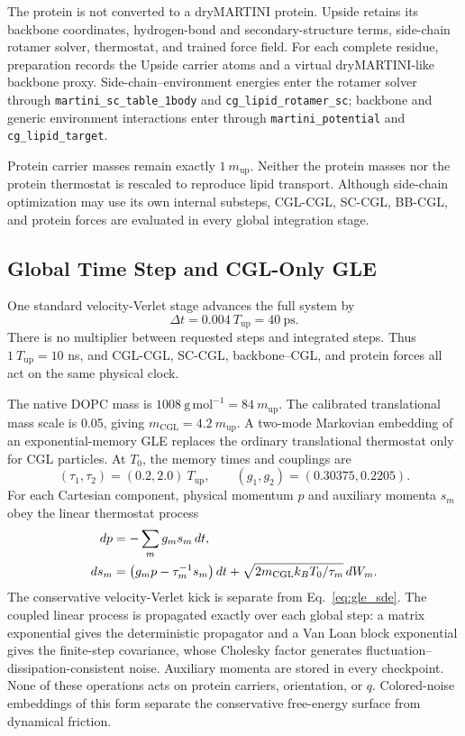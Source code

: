 \documentclass{article}
\begin{document}
The protein is not converted to a dryMARTINI protein.  Upside retains its
backbone coordinates, hydrogen-bond and secondary-structure terms, side-chain
rotamer solver, thermostat, and trained force field.  For each complete
residue, preparation records the Upside carrier atoms and a virtual
dryMARTINI-like backbone proxy.  Side-chain--environment energies enter the
rotamer solver through \texttt{martini\_sc\_table\_1body} and
\texttt{cg\_lipid\_rotamer\_sc}; backbone and generic environment interactions
enter through \texttt{martini\_potential} and \texttt{cg\_lipid\_target}.

Protein carrier masses remain exactly $1~m_{\mathrm{up}}$.  Neither the
protein masses nor the protein thermostat is rescaled to reproduce lipid
transport.  Although side-chain optimization may use its own internal
substeps, CGL-CGL, SC-CGL, BB-CGL, and protein forces are evaluated in every
global integration stage.

\subsection{Global Time Step and CGL-Only GLE}

One standard velocity-Verlet stage advances the full system by
\begin{equation}
\Delta t=0.004~T_{\mathrm{up}}=40~\mathrm{ps}.
\label{eq:timestep}
\end{equation}
There is no multiplier between requested steps and integrated steps.  Thus
$1~T_{\mathrm{up}}=10$ ns, and CGL-CGL, SC-CGL, backbone--CGL, and protein
forces all act on the same physical clock.

The native DOPC mass is $1008~\mathrm{g\,mol^{-1}}=84~m_{\mathrm{up}}$.  The
calibrated translational mass scale is 0.05, giving
$m_{\mathrm{CGL}}=4.2~m_{\mathrm{up}}$.  A two-mode Markovian embedding of an
exponential-memory GLE replaces the ordinary translational thermostat only for
CGL particles.  At $T_0$, the memory times and couplings are
\begin{equation}
(\tau_1,\tau_2)=(0.2,2.0)~T_{\mathrm{up}},\qquad
(g_1,g_2)=(0.30375,0.2205).
\label{eq:gle}
\end{equation}
For each Cartesian component, physical momentum $p$ and auxiliary momenta
$s_m$ obey the linear thermostat process
\begin{align}
dp &=-\sum_m g_m s_m\,dt,\notag\\
ds_m &=\left(g_mp-\tau_m^{-1}s_m\right)dt
+\sqrt{2m_{\mathrm{CGL}}k_BT_0/\tau_m}\,dW_m.
\label{eq:gle_sde}
\end{align}
The conservative velocity-Verlet kick is separate from
Eq.~\ref{eq:gle_sde}.  The coupled linear process is propagated exactly over
each global step: a matrix exponential gives the deterministic propagator and
a Van Loan block exponential gives the finite-step covariance, whose Cholesky
factor generates fluctuation--dissipation-consistent noise.  Auxiliary
momenta are stored in every checkpoint.  None of these operations acts on
protein carriers, orientation, or $q$.  Colored-noise embeddings of this form
separate the conservative free-energy surface from dynamical friction.
\cite{ceriotti2010}
\end{document}
